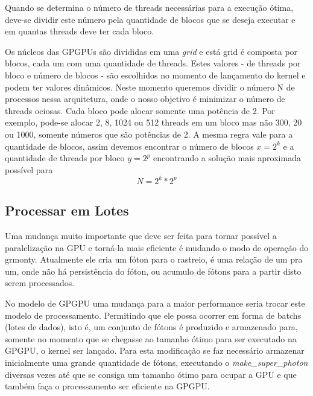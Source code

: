     Quando se determina o número de threads necessárias para a execução ótima, deve-se dividir este número pela quantidade de blocos que se deseja executar e em quantas threads deve ter cada bloco.

    Os núcleos das GPGPUs são divididas em uma \textit{grid} e está grid é composta por blocos, cada um com uma quantidade de threads. Estes valores - de threads por bloco e número de blocos - são escolhidos no momento de lançamento do kernel e podem ter valores dinâmicos. Neste momento queremos dividir o número N de processos nessa arquitetura, onde o nosso objetivo é minimizar o número de threads ociosas. Cada bloco pode alocar somente uma potência de 2. Por exemplo, pode-se alocar 2, 8, 1024 ou 512 threads em um bloco mas não 300, 20 ou 1000, somente números que são potências de 2. A mesma regra vale para a quantidade de blocos, assim devemos encontrar o número de blocos $ x = 2^k $ e a quantidade de threads por bloco $ y = 2^p $ encontrando a solução mais aproximada possível para $$ N = 2^k  * 2^p $$


  \subsection{Processar em Lotes}
    Uma mudança muito importante que deve ser feita para tornar possível a paralelização na GPU e torná-la mais eficiente é mudando o modo de operação do grmonty. Atualmente ele cria um fóton para o rastreio, é uma relação de um pra um, onde não há persistência do fóton, ou acumulo de fótons para a partir disto serem processados.

    No modelo de GPGPU uma mudança para a maior performance seria trocar este modelo de processamento. Permitindo que ele possa ocorrer em forma de batchs (lotes de dados), isto é, um conjunto de fótons é produzido e armazenado para, somente no momento que se chegasse ao tamanho ótimo para ser executado na GPGPU, o kernel ser lançado. Para esta modificação se faz necessário armazenar inicialmente uma grande quantidade de fótons, executando o \textit{make\_super\_photon} diversas vezes até que se consiga um tamanho ótimo para ocupar a GPU e que também faça o processamento ser eficiente na GPGPU.
